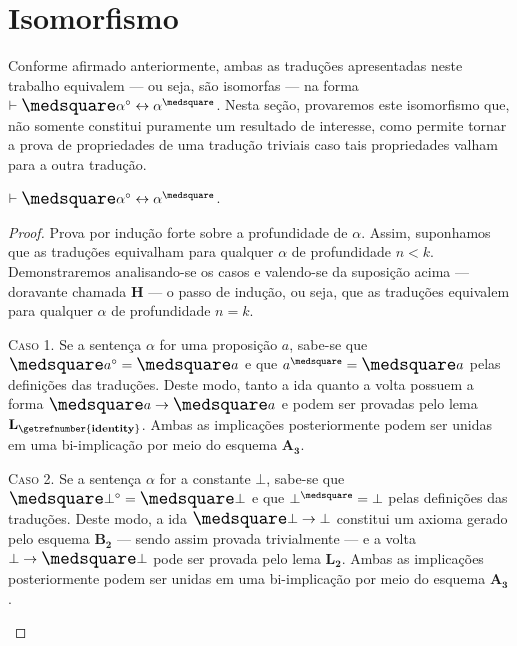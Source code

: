 \section{Isomorfismo}

Conforme afirmado anteriormente, ambas as traduções apresentadas neste trabalho equivalem --- ou seja, são isomorfas --- na forma $\entails\nec\alpha^\circ\leftrightarrow\alpha^\medsquare$. Nesta seção, provaremos este isomorfismo que, não somente constitui puramente um resultado de interesse, como permite tornar a prova de propriedades de uma tradução triviais caso tais propriedades valham para a outra tradução.

\begin{theorem}
    $\entails\nec\alpha^\circ\leftrightarrow\alpha^\medsquare$.

    \begin{proof}
        Prova por indução forte sobre a profundidade de $\alpha$.
        Assim, suponhamos que as traduções equivalham para qualquer $\alpha$ de profundidade $n<k$.
        Demonstraremos analisando-se os casos e valendo-se da suposição acima --- doravante chamada $\mathbf{H}$ --- o passo de indução, ou seja, que as traduções equivalem para qualquer $\alpha$ de profundidade $n=k$.

        \begin{case}
            \textsc{Caso 1.}
            Se a sentença $\alpha$ for uma proposição $a$, sabe-se que $\nec a^\circ=\nec a$ e que $a^\medsquare=\nec a$ pelas definições das traduções.
            Deste modo, tanto a ida quanto a volta possuem a forma $\nec a\to\nec a$ e podem ser provadas pelo lema \hyperref[identity]{$\mathbf{L_\getrefnumber{identity}}$}.
            Ambas as implicações posteriormente podem ser unidas em uma bi-implicação por meio do esquema \hyperref[MA3]{$\mathbf{A_3}$}.
        \end{case}

        \begin{case}
            \textsc{Caso 2.}
            Se a sentença $\alpha$ for a constante $\bot$, sabe-se que $\nec\bot^\circ=\nec\bot$ e que $\bot^\medsquare=\bot$ pelas definições das traduções.
            Deste modo, a ida $\nec\bot\to\bot$ constitui um axioma gerado pelo esquema \hyperref[MB2]{$\mathbf{B_2}$} --- sendo assim provada trivialmente --- e a volta $\bot\to\nec\bot$ pode ser provada pelo lema \hyperref[explosion]{$\mathbf{L_2}$}.
            Ambas as implicações posteriormente podem ser unidas em uma bi-implicação por meio do esquema \hyperref[MA3]{$\mathbf{A_3}$}.
        \end{case}


\end{proof}
\end{theorem}
